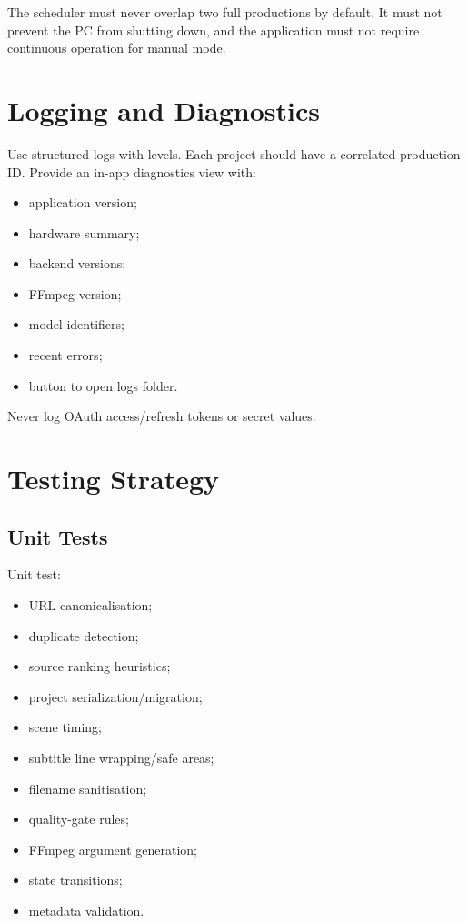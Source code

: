 \documentclass[10pt,journal,compsoc]{IEEEtran}
\begin{document}
The scheduler must never overlap two full productions by default. It must not prevent the PC from shutting down, and the application must not require continuous operation for manual mode.

\section{Logging and Diagnostics}

Use structured logs with levels. Each project should have a correlated production ID. Provide an in-app diagnostics view with:
\begin{itemize}
    \item application version;
    \item hardware summary;
    \item backend versions;
    \item FFmpeg version;
    \item model identifiers;
    \item recent errors;
    \item button to open logs folder.
\end{itemize}

Never log OAuth access/refresh tokens or secret values.

\section{Testing Strategy}

\subsection{Unit Tests}

Unit test:
\begin{itemize}
    \item URL canonicalisation;
    \item duplicate detection;
    \item source ranking heuristics;
    \item project serialization/migration;
    \item scene timing;
    \item subtitle line wrapping/safe areas;
    \item filename sanitisation;
    \item quality-gate rules;
    \item FFmpeg argument generation;
    \item state transitions;
    \item metadata validation.
\end{itemize}
\end{document}
